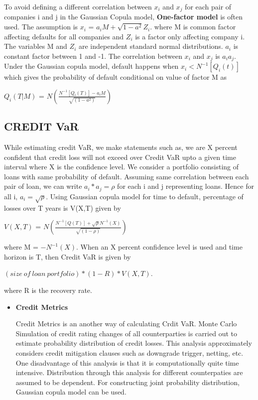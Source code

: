 \documentclass[11pt]{article}
\numberwithin{equation}{section}
\begin{document}
To avoid defining a different correlation between $x_i$ and $x_j$ for each pair of companies i and j in the Gaussian Copula model, \textbf{One-factor model} is often used. The assumption is $x_i$ = $a_iM + \sqrt{1-a^2}Z_i$. where M is common factor affecting defaults for all companies and $Z_i$ is a factor only affecting company i. The variables M and $Z_i$ are independent standard normal distributions. $a_i$ is constant factor between 1 and -1. The correlation between $x_i$ and $x_j$ is $a_ia_j$. Under the Gaussian copula model, default happens when $x_i<N^{-1}[Q_i(t)]$ which gives the probability of default conditional on value of factor M as 
\begin{center}
	$ Q_i(T|M)$ = $N \left(\frac{N^{-1}[Q_i(T)]-a_iM}{\sqrt{(1-a^2)}}\right)  $
\end{center}
\subsection{CREDIT VaR}
\medskip

While estimating credit VaR, we make statements such as, we are X percent confident that credit loss will not exceed over Credit VaR upto a given time interval where X is the confidence level. We consider a portfolio consisting of loans with same probability of default. Assuming same correlation between each pair of loan, we can write
$ a_i*a_j  = \rho $ for each i and j representing loans. Hence for all i, $ a_i=\sqrt{\rho} $. Using Gaussian copula model for time to default,
percentage of losses over T years is V(X,T) given by 
\begin{center}
	$ V(X,T)$ = $N \left(\frac{N^{-1}[Q(T)]+\sqrt{\rho}N^{-1}(X)}{\sqrt{(1-\rho)}}\right)  $
\end{center}

where M = $-N^{-1}(X)$. When an X percent confidence level is used and time horizon is T, then Credit VaR is given by
\begin{center}
 $(size\: of\: loan\: portfolio)*(1-R)*V(X,T)$. 
 \end{center}
 where R is the recovery rate.
\begin{itemize}

\item \textbf{Credit Metrics}

Credit Metrics is an another way of calculating Crdit VaR. Monte Carlo Simulation of credit rating changes of all counterparties is carried out to estimate probability distribution of credit losses. This analysis
approximately considers credit mitigation clauses such as downgrade trigger, netting, etc. One disadvantage of this analysis is that it is computationally quite time intensive.
Distribution through this analysis for different counterpaties are assumed to be dependent. For constructing joint probability distribution, Gaussian copula model can be used.

\end{itemize}
\pagebreak
\end{document}
